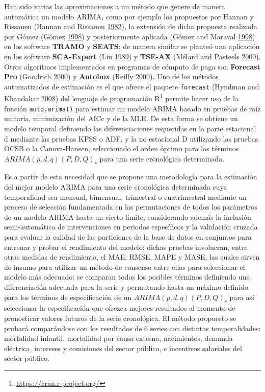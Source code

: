 \documentclass[]{article}
\let\rmarkdownfootnote\footnote%
\def\footnote{\protect\rmarkdownfootnote}
\begin{document}
Han sido varias las aproximaciones a un método que genere de manera
automática un modelo ARIMA, como por ejemplo los propuestos por Hannan y
Rissanen (Hannan and Rissanen \protect\hyperlink{ref-hannan}{1982}), la
extensión de dicha propuesta realizada por Gómez (Gómez
\protect\hyperlink{ref-gomez}{1998}) y posteriormente aplicada (Gómez
and Maraval \protect\hyperlink{ref-tramo}{1998}) en los software
\textbf{TRAMO} y \textbf{SEATS}; de manera similar se planteó una
aplicación en los software \textbf{SCA-Expert} (Liu
\protect\hyperlink{ref-liu}{1989}) y \textbf{TSE-AX} (Mélard and
Pasteels \protect\hyperlink{ref-melard}{2000}). Otros algoritmos
implementados en programas de cómputo de paga son \textbf{Forecast Pro}
(Goodrich \protect\hyperlink{ref-forecastpro}{2000}) y \textbf{Autobox}
(Reilly \protect\hyperlink{ref-autobox}{2000}). Uno de los métodos
automatizados de estimación es el que ofrece el paquete
\texttt{forecast} (Hyndman and Khandakar
\protect\hyperlink{ref-auto.arima}{2008}) del lenguaje de programación
R\footnote{\url{https://cran.r-project.org/}} permite hacer uso de la
función \texttt{auto.arima()} para estimar un modelo ARIMA basado en
pruebas de raíz unitaria, minimización del AICc y de la MLE. De esta
forma se obtiene un modelo temporal definiendo las diferenciaciones
requeridas en la parte estacional d mediante las pruebas KPSS o ADF, y
la no estacional D utilizando las pruebas OCSB o la Canova-Hansen,
seleccionado el orden óptimo para los términos \(ARIMA(p,d,q)(P,D,Q)_s\)
para una serie cronológica determinada.

Es a partir de esta necesidad que se propone una metodología para la
estimación del mejor modelo ARIMA para una serie cronológica determinada
cuya temporalidad sea mensual, bimensual, trimestral o cuatrimestral
mediante un proceso de selección fundamentada en las permutaciones de
todos los parámetros de un modelo ARIMA hasta un cierto límite,
considerando además la inclusión semi-automática de intervenciones en
periodos específicos y la validación cruzada para evaluar la calidad de
las particiones de la base de datos en conjuntos para entrenar y probar
el rendimiento del modelo; dichas pruebas involucran, entre otras
medidas de rendimiento, el MAE, RMSE, MAPE y MASE, las cuales sirven de
insumo para utilizar un método de consenso entre ellas para seleccionar
el modelo más adecuado: se comparan todos los posibles términos
definiendo una diferenciación adecuada para la serie y permutando hasta
un máximo definido para los términos de especificación de un
\(ARIMA(p,d,q)(P,D,Q)_s\) para así seleccionar la especificación que
ofrezca mejores resultados al momento de pronosticar valores futuros de
la serie cronológica. El método propuesto se probará comparándose con
los resultados de 6 series con distintas temporalidades: mortalidad
infantil, mortalidad por causa externa, nacimientos, demanda eléctrica,
intereses y comisiones del sector público, e incentivos salariales del
sector público.
\end{document}

